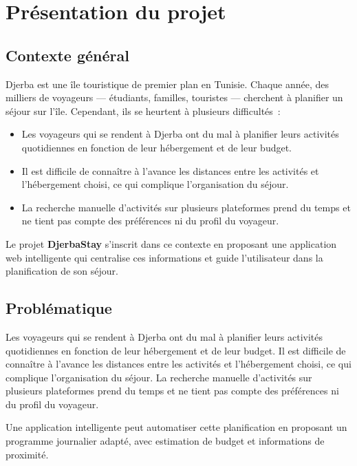 \documentclass[12pt,a4paper]{report}
\begin{document}
\chapter{Présentation du projet}

\section{Contexte général}

Djerba est une île touristique de premier plan en Tunisie. Chaque année, des
milliers de voyageurs --- étudiants, familles, touristes --- cherchent à
planifier un séjour sur l'île. Cependant, ils se heurtent à plusieurs
difficultés~:

\begin{itemize}
  \item Les voyageurs qui se rendent à Djerba ont du mal à planifier leurs
        activités quotidiennes en fonction de leur hébergement et de leur budget.
  \item Il est difficile de connaître à l'avance les distances entre les
        activités et l'hébergement choisi, ce qui complique l'organisation du
        séjour.
  \item La recherche manuelle d'activités sur plusieurs plateformes prend du
        temps et ne tient pas compte des préférences ni du profil du voyageur.
\end{itemize}

Le projet \textbf{DjerbaStay} s'inscrit dans ce contexte en proposant une
application web intelligente qui centralise ces informations et guide
l'utilisateur dans la planification de son séjour.

\section{Problématique}

Les voyageurs qui se rendent à Djerba ont du mal à planifier leurs activités
quotidiennes en fonction de leur hébergement et de leur budget. Il est
difficile de connaître à l'avance les distances entre les activités et
l'hébergement choisi, ce qui complique l'organisation du séjour. La recherche
manuelle d'activités sur plusieurs plateformes prend du temps et ne tient pas
compte des préférences ni du profil du voyageur.

Une application intelligente peut automatiser cette planification en proposant
un programme journalier adapté, avec estimation de budget et informations de
proximité.
\end{document}
